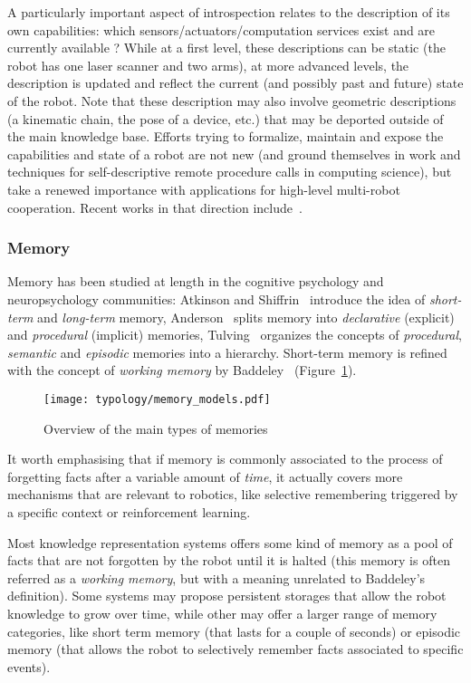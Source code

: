 A particularly important aspect of introspection relates to the description of
its own capabilities: which sensors/actuators/computation services exist and
are currently available ?  While at a first level, these descriptions can be
static (\eg the robot has one laser scanner and two arms), at more advanced
levels, the description is updated and reflect the current (and possibly past
and future) state of the robot. Note that these description may also involve
geometric descriptions (a kinematic chain, the pose of a device, etc.) that may
be deported outside of the main knowledge base. Efforts trying to formalize,
maintain and expose the capabilities and state of a robot are not new (and
ground themselves in work and techniques for self-descriptive remote procedure
calls in computing science), but take a renewed importance with applications
for high-level multi-robot cooperation. Recent works in that direction
include~\cite{Kunze2011}.

\subsubsection{Memory}
\label{sect|memory}

Memory has been studied at length in the cognitive psychology and
neuropsychology communities: Atkinson and Shiffrin~\cite{Atkinson1968}
introduce the idea of \emph{short-term} and \emph{long-term} memory,
Anderson~\cite{Anderson1976} splits memory into \emph{declarative} (explicit)
and \emph{procedural} (implicit) memories, Tulving~\cite{Tulving1985} organizes
the concepts of \emph{procedural}, \emph{semantic} and \emph{episodic} memories
into a hierarchy. Short-term memory is refined with the concept of
\emph{working memory} by Baddeley~\cite{Baddeley2010}
(Figure~\ref{fig|memory_models}).

\begin{figure}
    \centering
    \texttt{[image: typology/memory\_models.pdf]}
    \caption{Overview of the main types of memories}
    \label{fig|memory_models}
\end{figure}

It worth emphasising that if memory is commonly associated to the process of
forgetting facts after a variable amount of \emph{time}, it actually covers
more mechanisms that are relevant to robotics, like selective remembering
triggered by a specific context or reinforcement learning.

Most knowledge representation systems offers some kind of memory as a pool of
facts that are not forgotten by the robot until it is halted (this memory is
often referred as a \emph{working memory}, but with a meaning unrelated to
Baddeley's definition). Some systems may propose persistent storages that allow
the robot knowledge to grow over time, while other may offer a larger range of
memory categories, like short term memory (that lasts for a couple of seconds)
or episodic memory (that allows the robot to selectively remember facts
associated to specific events).

